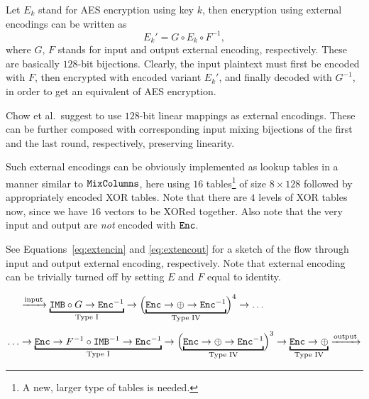 	Let $E_k$ stand for AES encryption using key $k$, then encryption using external encodings can be written as
	\begin{equation}
	\label{eq:extenc}
		E_k' = G \circ E_k \circ F^{-1} ,
	\end{equation}
	where $G$, $F$ stands for input and output external encoding, respectively. These are basically $128$-bit bijections. Clearly, the input plaintext must first be encoded with $F$, then encrypted with encoded variant $E_k'$, and finally decoded with $G^{-1}$, in order to get an equivalent of AES encryption.
	
	Chow et al.\ suggest to use $128$-bit linear mappings as external encodings. These can be further composed with corresponding input mixing bijections of the first and the last round, respectively, preserving linearity.
	
	Such external encodings can be obviously implemented as lookup tables in a manner similar to $\texttt{MixColumns}$, here using $16$ tables\footnote{A new, larger type of tables is needed.} of size $8\times 128$ followed by appropriately encoded XOR tables. Note that there are $4$ levels of XOR tables now, since we have $16$ vectors to be XORed together. Also note that the very input and output are {\em not} encoded with $\texttt{Enc}$.
	
	See Equations~\ref{eq:extencin} and \ref{eq:extencout} for a sketch of the flow through input and output external encoding, respectively. Note that external encoding can be trivially turned off by setting $E$ and $F$ equal to identity.
	
	\begin{align}
	\label{eq:extencin}
		&\xrightarrow{\textnormal{input}}\underbracket{\IMB\circ G\rarr\Enc^{-1}}_{\textnormal{Type I}}\rarr\Bigl(\underbracket{\Enc\rarr\xor\rarr\Enc^{-1}}_{\textnormal{Type IV}}\Bigr)^4\rarr\ldots\\[.5em]
	\label{eq:extencout}
		\ldots&\rarr\underbracket{\Enc\rarr F^{-1}\circ\IMB^{-1}\rarr\Enc^{-1}}_{\textnormal{Type I}}\rarr\Bigl(\underbracket{\Enc\rarr\xor\rarr\Enc^{-1}}_{\textnormal{Type IV}}\Bigr)^3\rarr\underbracket{\Enc\rarr\xor}_{\textnormal{Type IV}}\xrightarrow{\textnormal{output}}
	\end{align}



